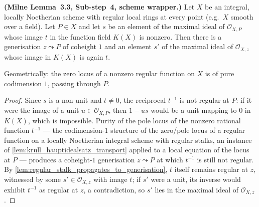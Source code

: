 \begin{lemma}\leanok
  \label{lem:milne33_diagonal_vanishing_purity}

  \textbf{(Milne Lemma~3.3, Sub-step~4, scheme wrapper.)} Let \(X\) be an
  integral, locally Noetherian scheme with regular local rings at every point
  (e.g.\ \(X\) smooth over a field). Let \(P \in X\) and let \(s\) be an
  element of the maximal ideal of \(\mathcal O_{X,P}\) whose image \(t\) in
  the function field \(K(X)\) is nonzero. Then there is a generisation
  \(z \leadsto P\) of coheight \(1\) and an element \(s'\) of the maximal
  ideal of \(\mathcal O_{X,z}\) whose image in \(K(X)\) is again \(t\).

  Geometrically: the zero locus of a nonzero regular function on \(X\) is of
  pure codimension \(1\), passing through \(P\).
\end{lemma}
\begin{proof}\leanok
  Since \(s\) is a non-unit and \(t \neq 0\), the reciprocal \(t^{-1}\) is not
  regular at \(P\): if it were the image of a unit \(u \in \mathcal O_{X,P}\),
  then \(1 - us\) would be a unit mapping to \(0\) in \(K(X)\), which is
  impossible. Purity of the pole locus of the nonzero rational function
  \(t^{-1}\) --- the codimension-\(1\) structure of the zero/pole locus of a
  regular function on a locally Noetherian integral scheme with regular
  stalks, an instance of \cref{lem:krull_hauptidealsatz_transport} applied to
  a local equation of the locus at \(P\) --- produces a coheight-\(1\)
  generisation \(z \leadsto P\) at which \(t^{-1}\) is still not regular. By
  \cref{lem:regular_stalk_propagates_to_generisation}, \(t\) itself remains
  regular at \(z\), witnessed by some \(s' \in \mathcal O_{X,z}\) with image
  \(t\); if \(s'\) were a unit, its inverse would exhibit \(t^{-1}\) as
  regular at \(z\), a contradiction, so \(s'\) lies in the maximal ideal of
  \(\mathcal O_{X,z}\).
\end{proof}

